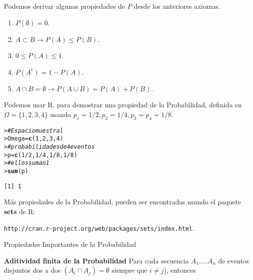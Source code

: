 \documentclass{article}\usepackage[]{graphicx}\usepackage[]{color}
\makeatletter
\newcommand{\hlnum}[1]{\textcolor[rgb]{0.686,0.059,0.569}{#1}}%
\newcommand{\hlcom}[1]{\textcolor[rgb]{0.678,0.584,0.686}{\textit{#1}}}%
\newcommand{\hlopt}[1]{\textcolor[rgb]{0,0,0}{#1}}%
\newcommand{\hlstd}[1]{\textcolor[rgb]{0.345,0.345,0.345}{#1}}%
\newcommand{\hlkwb}[1]{\textcolor[rgb]{0.69,0.353,0.396}{#1}}%
\newcommand{\hlkwd}[1]{\textcolor[rgb]{0.737,0.353,0.396}{\textbf{#1}}}%
\newenvironment{kframe}{%
 \def\at@end@of@kframe{}%
 \ifinner\ifhmode%
  \def\at@end@of@kframe{\end{minipage}}%
  \begin{minipage}{\columnwidth}%
 \fi\fi%
 \def\FrameCommand##1{\hskip\@totalleftmargin \hskip-\fboxsep
 \colorbox{shadecolor}{##1}\hskip-\fboxsep
     \hskip-\linewidth \hskip-\@totalleftmargin \hskip\columnwidth}%
 \MakeFramed {\advance\hsize-\width
   \@totalleftmargin\z@ \linewidth\hsize
   \@setminipage}}%
 {\par\unskip\endMakeFramed%
 \at@end@of@kframe}
\newenvironment{knitrout}{}{} %
\makeatother
\begin{document}
Podemos derivar algunas propiedades de $P$ desde los anteriores axiomas. 

\begin{enumerate}
\item $P(\emptyset ) = 0$.
\item $A \subset B \rightarrow P(A) \leq P(B)$.
\item $0 \leq P(A) \leq 1$.
\item $ P(A^c) = 1-P(A)$.
\item $A \cap B = \emptyset \rightarrow  P(A \cup B) = P(A) + P(B)$.
\end{enumerate}



Podemos usar R, para demostrar una propiedad de la Probabilidad, definida en $\Omega = \{1,2,3,4\}$ usando $p_1 = 1/2, p_2 = 1/4, p_3 = p_4 = 1/8$.

\begin{knitrout}
\color{fgcolor}\begin{kframe}
\begin{alltt}
\hlstd{> }\hlcom{# Espacio muestral}
\hlstd{> }\hlstd{Omega} \hlkwb{=} \hlkwd{c}\hlstd{(}\hlnum{1}\hlstd{,} \hlnum{2}\hlstd{,} \hlnum{3}\hlstd{,} \hlnum{4}\hlstd{)}
\hlstd{> }\hlcom{# probabilidades de  4 eventos}
\hlstd{> }\hlstd{p} \hlkwb{=} \hlkwd{c}\hlstd{(}\hlnum{1}\hlopt{/}\hlnum{2}\hlstd{,} \hlnum{1}\hlopt{/}\hlnum{4}\hlstd{,} \hlnum{1}\hlopt{/}\hlnum{8}\hlstd{,} \hlnum{1}\hlopt{/}\hlnum{8}\hlstd{)}
\hlstd{> }\hlcom{# ellos suman 1}
\hlstd{> }\hlkwd{sum}\hlstd{(p)}
\end{alltt}
\begin{verbatim}
[1] 1
\end{verbatim}
\end{kframe}
\end{knitrout}

M\'as propiedades de la Probabilidad, pueden ser encontradas usando el paquete \textbf{sets } de R: 

\texttt{http://cran.r-project.org/web/packages/sets/index.html}.

\vspace{0.5cm}

{\large Propiedades Importantes de la Probabilidad}

\vspace{0.6cm}

\textbf{Aditividad finita de la Probabilidad} Para cada secuencia $A_1, \dots A_n$ de eventos disjuntos dos a dos $(A_i \cap A_j) = \emptyset $ siempre que $i \neq j$), entonces
\end{document}
